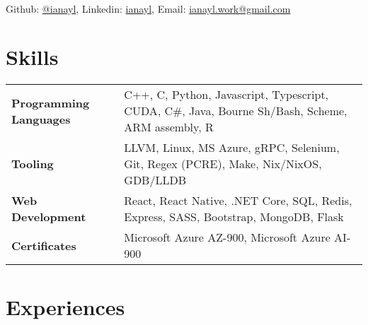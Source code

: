 \documentclass[9pt]{article}
\author{Ian Li}
\makeatletter
\renewcommand{\maketitle}{
		\vspace{-8em}
    \begin{center}
		{\huge\bfseries
		\theauthor}
    \vspace{0.5em}
    \\
    Github: \href{https://github.com/ianayl}{@ianayl}, Linkedin: \href{https://www.linkedin.com/in/ianayl}{ianayl}, Email: \url{ianayl.work@gmail.com}
    \end{center}
    \vspace{-1.5em}
}
\makeatother
\begin{document}
\maketitle


\section{Skills}

\begin{tabular}{ l l }
    \textbf{Programming Languages} & C++, C, Python, Javascript, Typescript, CUDA, C\#, Java, Bourne Sh/Bash, Scheme, ARM assembly, R \\
    \textbf{Tooling} & LLVM, Linux, MS Azure, gRPC, Selenium, Git, Regex (PCRE), Make, Nix/NixOS, GDB/LLDB \\
    \textbf{Web Development} & React, React Native, .NET Core, SQL, Redis, Express, SASS, Bootstrap, MongoDB, Flask \\
    \textbf{Certificates} & Microsoft Azure AZ-900, Microsoft Azure AI-900
\end{tabular}

\section*{Experiences}

\end{document}
